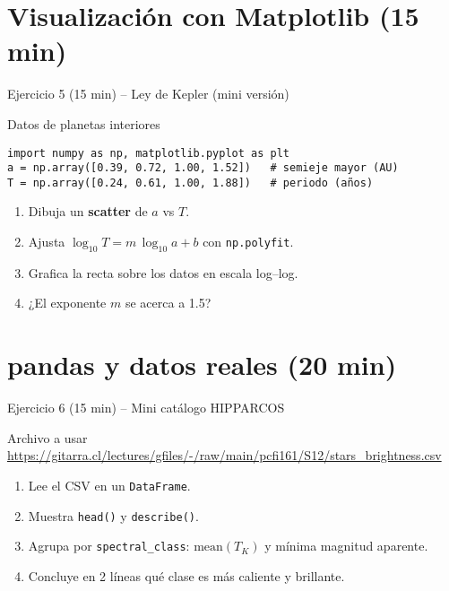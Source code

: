 \documentclass[10pt]{beamer}
\begin{document}
\section{Visualización con Matplotlib (15 min)}

\begin{frame}[fragile]{Ejercicio 5 (15 min) – Ley de Kepler (mini versión)}
\begin{block}{Datos de planetas interiores}
\begin{verbatim}
import numpy as np, matplotlib.pyplot as plt
a = np.array([0.39, 0.72, 1.00, 1.52])   # semieje mayor (AU)
T = np.array([0.24, 0.61, 1.00, 1.88])   # periodo (años)
\end{verbatim}
\end{block}
\begin{enumerate}
  \item Dibuja un \textbf{scatter} de \(a\) vs \(T\).
  \item Ajusta \(\log_{10}T = m\,\log_{10}a + b\) con \texttt{np.polyfit}.
  \item Grafica la recta sobre los datos en escala log–log.
  \item ¿El exponente \(m\) se acerca a 1.5?
\end{enumerate}
\end{frame}

\section{pandas y datos reales (20 min)}

\begin{frame}[fragile]{Ejercicio 6 (15 min) – Mini catálogo HIPPARCOS}
\begin{block}{Archivo a usar}
\url{https://gitarra.cl/lectures/gfiles/-/raw/main/pcfi161/S12/stars_brightness.csv}
\end{block}
\begin{enumerate}
  \item Lee el CSV en un \texttt{DataFrame}.
  \item Muestra \texttt{head()} y \texttt{describe()}.
  \item Agrupa por \texttt{spectral\_class}:  
        \(\displaystyle \text{mean}(T_K)\) y mínima magnitud aparente.
  \item Concluye en 2 líneas qué clase es más caliente y brillante.
\end{enumerate}
\end{frame}
\end{document}
